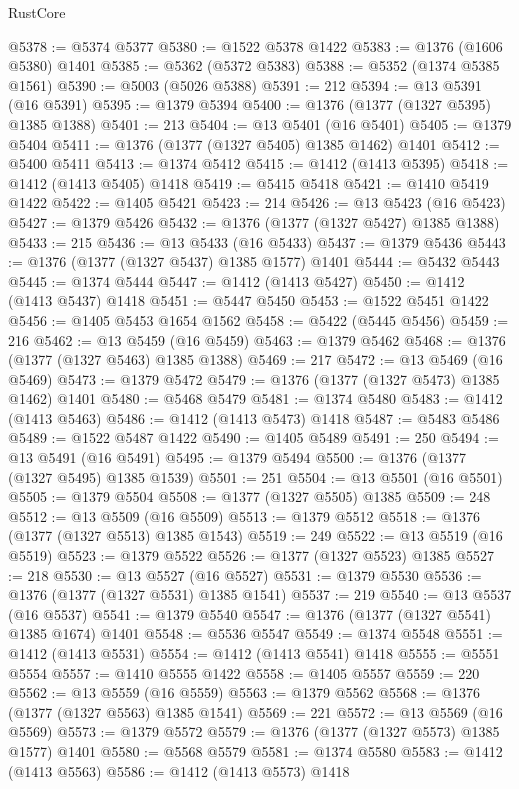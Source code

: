 \begin{lexlean}{RustCore}
\begin{coremodule}
@5378 := @5374 @5377
@5380 := @1522 @5378 @1422
@5383 := @1376 (@1606 @5380) @1401
@5385 := @5362 (@5372 @5383)
@5388 := @5352 (@1374 @5385 @1561)
@5390 := @5003 (@5026 @5388)
@5391 := 212
@5394 := @13 @5391 (@16 @5391)
@5395 := @1379 @5394
@5400 := @1376 (@1377 (@1327 @5395) @1385 @1388)
@5401 := 213
@5404 := @13 @5401 (@16 @5401)
@5405 := @1379 @5404
@5411 := @1376 (@1377 (@1327 @5405) @1385 @1462) @1401
@5412 := @5400 @5411
@5413 := @1374 @5412
@5415 := @1412 (@1413 @5395)
@5418 := @1412 (@1413 @5405) @1418
@5419 := @5415 @5418
@5421 := @1410 @5419 @1422
@5422 := @1405 @5421
@5423 := 214
@5426 := @13 @5423 (@16 @5423)
@5427 := @1379 @5426
@5432 := @1376 (@1377 (@1327 @5427) @1385 @1388)
@5433 := 215
@5436 := @13 @5433 (@16 @5433)
@5437 := @1379 @5436
@5443 := @1376 (@1377 (@1327 @5437) @1385 @1577) @1401
@5444 := @5432 @5443
@5445 := @1374 @5444
@5447 := @1412 (@1413 @5427)
@5450 := @1412 (@1413 @5437) @1418
@5451 := @5447 @5450
@5453 := @1522 @5451 @1422
@5456 := @1405 @5453 @1654 @1562
@5458 := @5422 (@5445 @5456)
@5459 := 216
@5462 := @13 @5459 (@16 @5459)
@5463 := @1379 @5462
@5468 := @1376 (@1377 (@1327 @5463) @1385 @1388)
@5469 := 217
@5472 := @13 @5469 (@16 @5469)
@5473 := @1379 @5472
@5479 := @1376 (@1377 (@1327 @5473) @1385 @1462) @1401
@5480 := @5468 @5479
@5481 := @1374 @5480
@5483 := @1412 (@1413 @5463)
@5486 := @1412 (@1413 @5473) @1418
@5487 := @5483 @5486
@5489 := @1522 @5487 @1422
@5490 := @1405 @5489
@5491 := 250
@5494 := @13 @5491 (@16 @5491)
@5495 := @1379 @5494
@5500 := @1376 (@1377 (@1327 @5495) @1385 @1539)
@5501 := 251
@5504 := @13 @5501 (@16 @5501)
@5505 := @1379 @5504
@5508 := @1377 (@1327 @5505) @1385
@5509 := 248
@5512 := @13 @5509 (@16 @5509)
@5513 := @1379 @5512
@5518 := @1376 (@1377 (@1327 @5513) @1385 @1543)
@5519 := 249
@5522 := @13 @5519 (@16 @5519)
@5523 := @1379 @5522
@5526 := @1377 (@1327 @5523) @1385
@5527 := 218
@5530 := @13 @5527 (@16 @5527)
@5531 := @1379 @5530
@5536 := @1376 (@1377 (@1327 @5531) @1385 @1541)
@5537 := 219
@5540 := @13 @5537 (@16 @5537)
@5541 := @1379 @5540
@5547 := @1376 (@1377 (@1327 @5541) @1385 @1674) @1401
@5548 := @5536 @5547
@5549 := @1374 @5548
@5551 := @1412 (@1413 @5531)
@5554 := @1412 (@1413 @5541) @1418
@5555 := @5551 @5554
@5557 := @1410 @5555 @1422
@5558 := @1405 @5557
@5559 := 220
@5562 := @13 @5559 (@16 @5559)
@5563 := @1379 @5562
@5568 := @1376 (@1377 (@1327 @5563) @1385 @1541)
@5569 := 221
@5572 := @13 @5569 (@16 @5569)
@5573 := @1379 @5572
@5579 := @1376 (@1377 (@1327 @5573) @1385 @1577) @1401
@5580 := @5568 @5579
@5581 := @1374 @5580
@5583 := @1412 (@1413 @5563)
@5586 := @1412 (@1413 @5573) @1418

\end{coremodule}
\end{lexlean}
